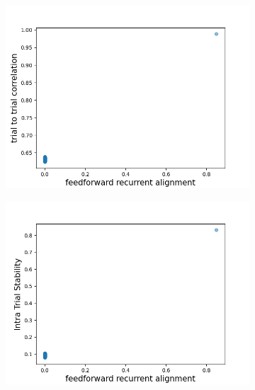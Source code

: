 \documentclass[11pt]{article}
\begin{document}
%	
		\begin{figure}[H]
			\centering
			\begin{subfigure}[b]{0.45\textwidth}
				\includegraphics[width=\textwidth]{../figures/low_rank_sym_ttc.png}
				\caption{}
			\end{subfigure}
			\hfill
			\begin{subfigure}[b]{0.45\textwidth}
				\includegraphics[width=\textwidth]{../figures/its_low_rank_sym_without_noise.png}
				\caption{}

\end{subfigure}
\end{figure}
\end{document}
